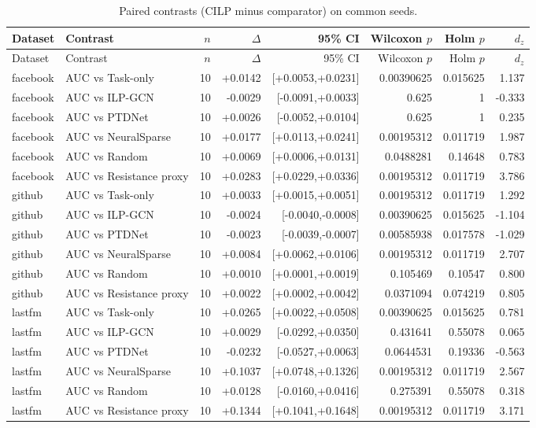 \begin{center}\scriptsize
\begin{longtable}{@{}llrrrrrr@{}}
\caption{Paired contrasts (CILP minus comparator) on common seeds.}\\
\toprule
Dataset & Contrast & $n$ & $\Delta$ & 95\% CI & Wilcoxon $p$ & Holm $p$ & $d_z$ \\
\midrule
\endfirsthead
\toprule
Dataset & Contrast & $n$ & $\Delta$ & 95\% CI & Wilcoxon $p$ & Holm $p$ & $d_z$ \\
\midrule
\endhead
facebook & AUC vs Task-only & 10 & +0.0142 & [+0.0053,+0.0231] & 0.00390625 & 0.015625 & 1.137 \\
facebook & AUC vs ILP-GCN & 10 & -0.0029 & [-0.0091,+0.0033] & 0.625 & 1 & -0.333 \\
facebook & AUC vs PTDNet & 10 & +0.0026 & [-0.0052,+0.0104] & 0.625 & 1 & 0.235 \\
facebook & AUC vs NeuralSparse & 10 & +0.0177 & [+0.0113,+0.0241] & 0.00195312 & 0.011719 & 1.987 \\
facebook & AUC vs Random & 10 & +0.0069 & [+0.0006,+0.0131] & 0.0488281 & 0.14648 & 0.783 \\
facebook & AUC vs Resistance proxy & 10 & +0.0283 & [+0.0229,+0.0336] & 0.00195312 & 0.011719 & 3.786 \\
github & AUC vs Task-only & 10 & +0.0033 & [+0.0015,+0.0051] & 0.00195312 & 0.011719 & 1.292 \\
github & AUC vs ILP-GCN & 10 & -0.0024 & [-0.0040,-0.0008] & 0.00390625 & 0.015625 & -1.104 \\
github & AUC vs PTDNet & 10 & -0.0023 & [-0.0039,-0.0007] & 0.00585938 & 0.017578 & -1.029 \\
github & AUC vs NeuralSparse & 10 & +0.0084 & [+0.0062,+0.0106] & 0.00195312 & 0.011719 & 2.707 \\
github & AUC vs Random & 10 & +0.0010 & [+0.0001,+0.0019] & 0.105469 & 0.10547 & 0.800 \\
github & AUC vs Resistance proxy & 10 & +0.0022 & [+0.0002,+0.0042] & 0.0371094 & 0.074219 & 0.805 \\
lastfm & AUC vs Task-only & 10 & +0.0265 & [+0.0022,+0.0508] & 0.00390625 & 0.015625 & 0.781 \\
lastfm & AUC vs ILP-GCN & 10 & +0.0029 & [-0.0292,+0.0350] & 0.431641 & 0.55078 & 0.065 \\
lastfm & AUC vs PTDNet & 10 & -0.0232 & [-0.0527,+0.0063] & 0.0644531 & 0.19336 & -0.563 \\
lastfm & AUC vs NeuralSparse & 10 & +0.1037 & [+0.0748,+0.1326] & 0.00195312 & 0.011719 & 2.567 \\
lastfm & AUC vs Random & 10 & +0.0128 & [-0.0160,+0.0416] & 0.275391 & 0.55078 & 0.318 \\
lastfm & AUC vs Resistance proxy & 10 & +0.1344 & [+0.1041,+0.1648] & 0.00195312 & 0.011719 & 3.171 \\
\bottomrule
\end{longtable}
\end{center}
